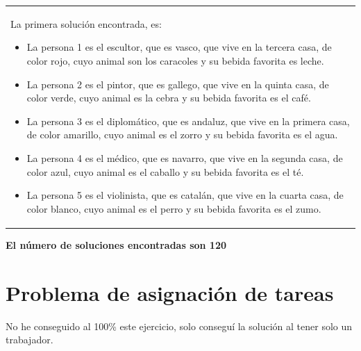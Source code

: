 \documentclass{article}
\begin{document}
\vspace {1cm}
\begin{tabular}{p{15cm}}{ La primera solución encontrada, es:
  \begin{itemize}
    \item La persona 1 es el escultor, que es vasco, que vive en la tercera casa, de color rojo, cuyo animal son los caracoles y su bebida favorita es leche.
    \item La persona 2 es el pintor, que es gallego, que vive en la quinta casa, de color verde, cuyo animal es la cebra y su bebida favorita es el café.
    \item La persona 3 es el diplomático, que es andaluz, que vive en la primera casa, de color amarillo, cuyo animal es el zorro y su bebida favorita es el agua.
    \item La persona 4 es el médico, que es navarro, que vive en la segunda casa, de color azul, cuyo animal es el caballo y su bebida favorita es el té.
    \item La persona 5 es el violinista, que es catalán, que vive en la cuarta casa, de color blanco, cuyo animal es el perro y su bebida favorita es el zumo.
  \end{itemize}
}\end{tabular}

\textbf{El número de soluciones encontradas son 120}

\newpage 
\section {\large{Problema de asignación de tareas}}
No he conseguido al 100\% este ejercicio, solo conseguí la solución al tener solo un 
trabajador.

\newpage 
\end{document}
